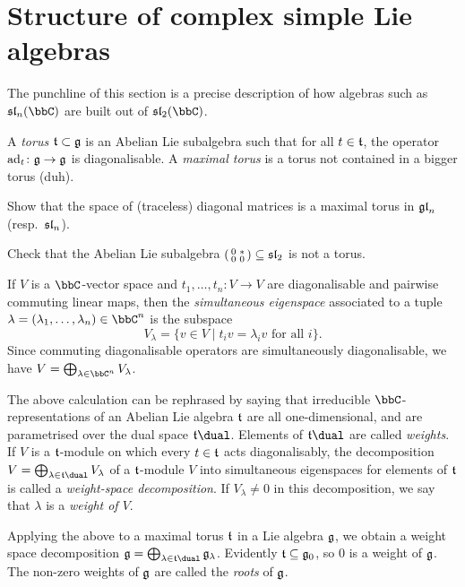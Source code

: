 \section{Structure of complex simple Lie algebras}
The punchline of this section is a precise description of how algebras such as
$\sl_n(\bbC)$ are built out of $\sl_2(\bbC)$. 

\begin{definition}
    A \emph{torus} $\tt\subset\frakg$ is an Abelian Lie subalgebra such that for
    all $t\in \tt$, the operator $\adj_t\colon \frakg\to \frakg$ is
    diagonalisable. A \emph{maximal torus} is a torus not contained in a bigger
    torus (duh).
\end{definition}

\begin{exercise}
    Show that the space of (traceless) diagonal matrices is a maximal torus in
    $\gl_n$ (resp.\ $\sl_n$).
\end{exercise}

\begin{exercise}
    Check that the Abelian Lie subalgebra $\mat{0&\ast \\ 0&0}\subseteq \sl_2$
    is not a torus.
\end{exercise}

If $V$ is a $\bbC$-vector space and $t_1,\ldots,t_n\colon V\to V$ are diagonalisable
and pairwise commuting linear maps, then the \emph{simultaneous eigenspace}
associated to a tuple $\lambda=(\lambda_1,\ldots,\lambda_n)\in \bbC^n$ is the
subspace 
\[V_{\lambda}=\{v\in V\;|\; t_i v = \lambda_i v \text{ for all }i\}.\]
Since commuting diagonalisable operators are simultaneously diagonalisable, we
have $V=\bigoplus_{\lambda\in \bbC^n}V_{\lambda}$.

The above calculation can be rephrased by saying that irreducible
$\bbC$-representations of an Abelian Lie algebra $\tt$ are all one-dimensional,
and are parametrised over the dual space $\tt\dual$. Elements of $\tt\dual$ are
called \emph{weights}. If $V$ is a $\tt$-module on which every $t\in \tt$ acts
diagonalisably, the decomposition $V=\bigoplus_{\lambda\in\tt\dual}V_\lambda$ of
a $\tt$-module $V$ into simultaneous eigenspaces for elements of $\tt$ is called
a \emph{weight-space decomposition}. If $V_\lambda\neq 0$ in this decomposition, we say that $\lambda$
is a \emph{weight of $V$}.

Applying the above to a maximal torus $\tt$ in a Lie algebra $\frakg$, we obtain
a weight space decomposition $\frakg=\bigoplus_{\lambda\in \tt\dual}
\frakg_\lambda$. Evidently $\tt\subseteq \frakg_0$, so $0$ is a weight of
$\frakg$. The non-zero weights of $\frakg$ are called the \emph{roots} of
$\frakg$.

